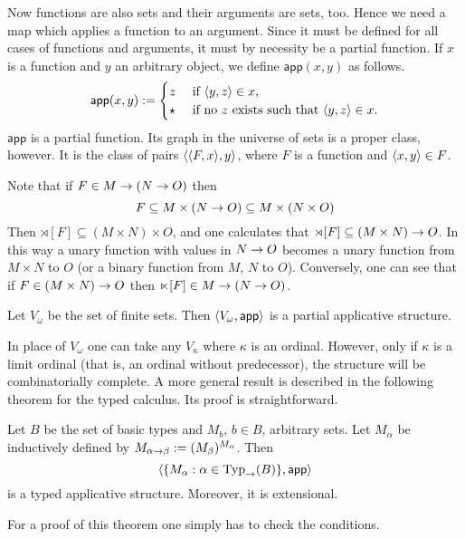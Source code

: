 Now functions are also sets and their arguments are sets, too. 
Hence we need a map which applies a function to an argument. 
Since it must be defined for all cases of
functions and arguments, it must by necessity be a partial
function. If $x$ is a function and $y$ an arbitrary object, 
we define $\mathsf{app}(x,y)$ as follows.
\begin{equation}
\mathsf{app}(x,y) := \begin{cases}
        z & \text{ if $\langle y, z\rangle \in x$,} \\
        \star & \text{ if no $z$ exists such that 
$\langle y,z\rangle \in x$.}
        \end{cases}
\end{equation}
$\mathsf{app}$ is a partial function. Its graph in the universe
of sets is a proper class, however. It is the class of pairs
$\langle \langle F, x\rangle, y\rangle$, where $F$ is a function and
$\langle x, y\rangle \in F$.

Note that if $F \in M \rightarrow (N \rightarrow O)$ then
\begin{equation}
F \subseteq M \times (N \rightarrow O) \subseteq M\times (N\times O)
\end{equation}
Then $\rtimes [F] \subseteq (M \times N) \times O$, and
one calculates that $\rtimes [F] \subseteq (M \times N)
\rightarrow O$. In this way a unary function with values in
$N \rightarrow O$ becomes a unary function from $M\times N$
to $O$ (or a binary function from $M$, $N$ to $O$). Conversely,
one can see that if $F \in (M \times N) \rightarrow O$ then
$\ltimes [F] \in M \rightarrow (N \rightarrow O)$.
\begin{stz}
Let $V_{\omega}$ be the set of finite sets. Then $\langle V_{\omega},
\mathsf{app}\rangle$ is a partial applicative structure.
\end{stz}
In place of $V_{\omega}$ one can take any $V_{\kappa}$ where
$\kappa$ is an ordinal. However, only if $\kappa$ is a limit 
ordinal (that is, an ordinal without predecessor), the structure 
will be combinatorially complete. A more general result is described 
in the following theorem for the typed calculus. Its proof is 
straightforward.
\begin{stz}
Let $B$ be the set of basic types and $M_{b}$, $b \in B$,
arbitrary sets. Let $M_{\alpha}$ be inductively defined
by $M_{\alpha \rightarrow \beta} := (M_{\beta})^{M_{\alpha}}$.
Then 
\begin{equation}
\langle \{M_{\alpha} : \alpha \in \operatorname{Typ}_{\rightarrow}(B)\},
\mathsf{app}\rangle
\end{equation}
is a typed applicative structure. Moreover, it is extensional.
\end{stz}
For a proof of this theorem one simply has to check the conditions.

